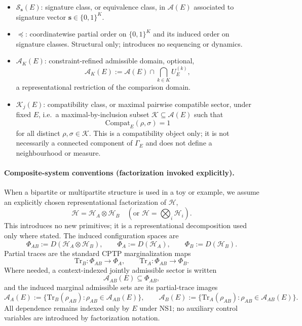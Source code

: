 \documentclass[aps,prx,onecolumn,11pt]{revtex4-2}
\theoremstyle{plain}
\theoremstyle{definition}
\theoremstyle{remark}
\begin{document}
\begin{itemize}
\item $\mathcal{S}_{\mathbf{s}}(E)$: signature class, or equivalence
class, in $\mathcal{A}(E)$ associated to signature vector
$\mathbf{s} \in \{0,1\}^K$.

\item $\preceq$: coordinatewise partial order on $\{0,1\}^K$ and its
induced order on signature classes. Structural only; introduces no
sequencing or dynamics.

\item $\mathcal{A}_K(E)$: constraint-refined admissible domain,
optional,
\[
\mathcal{A}_K(E)
:=
\mathcal{A}(E)
\cap
\bigcap_{k \in K} U^{(k)}_E,
\]
a representational restriction of the comparison domain.

\item $\mathcal{K}_j(E)$: compatibility class, or maximal pairwise
compatible sector, under fixed $E$, i.e.\ a maximal-by-inclusion subset
$\mathcal{K} \subseteq \mathcal{A}(E)$ such that
\[
\mathrm{Compat}_E(\rho,\sigma)=1
\]
for all distinct $\rho, \sigma \in \mathcal{K}$. This is a
compatibility object only; it is not necessarily a connected component
of $\Gamma_E$ and does not define a neighbourhood or measure.

\end{itemize}

\paragraph{Composite-system conventions (factorization invoked
explicitly).}
When a bipartite or multipartite structure is used in a toy or example,
we assume an explicitly chosen representational factorization of
$\mathcal{H}$,
\[
\mathcal{H} = \mathcal{H}_A \otimes \mathcal{H}_B
\quad(\text{or } \mathcal{H} = \bigotimes_i \mathcal{H}_i).
\]
This introduces no new primitives; it is a representational
decomposition used only where stated. The induced configuration spaces
are
\[
\Phi_{AB} := D(\mathcal{H}_A \otimes \mathcal{H}_B), \qquad
\Phi_A := D(\mathcal{H}_A), \qquad
\Phi_B := D(\mathcal{H}_B).
\]
Partial traces are the standard CPTP marginalization maps
\[
\mathrm{Tr}_B : \Phi_{AB} \to \Phi_A, \qquad
\mathrm{Tr}_A : \Phi_{AB} \to \Phi_B.
\]
Where needed, a context-indexed jointly admissible sector is written
\[
\mathcal{A}_{AB}(E) \subseteq \Phi_{AB},
\]
and the induced marginal admissible sets are its partial-trace images
\[
\mathcal{A}_A(E) := \{\mathrm{Tr}_B(\rho_{AB}) :
\rho_{AB} \in \mathcal{A}_{AB}(E)\}, \qquad
\mathcal{A}_B(E) := \{\mathrm{Tr}_A(\rho_{AB}) :
\rho_{AB} \in \mathcal{A}_{AB}(E)\}.
\]
All dependence remains indexed only by $E$ under NS1; no auxiliary
control variables are introduced by factorization notation.
\end{document}
